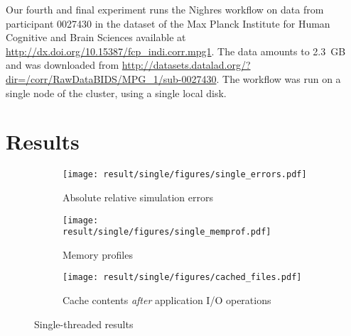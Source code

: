 \documentclass[conference]{IEEEtran}
\begin{document}
            Our fourth and final experiment runs the Nighres workflow on
            data from participant 0027430 in the dataset of the Max Planck Institute for
            Human Cognitive and Brain Sciences
            available at
            \url{http://dx.doi.org/10.15387/fcp_indi.corr.mpg1}. The data
            amounts to 2.3~GB and was downloaded from
            \url{http://datasets.datalad.org/?dir=/corr/RawDataBIDS/MPG_1/sub-0027430}.
            The workflow was run on a single node of the cluster, using a
            single local disk.

    \section{Results}
    \label{results}

    \begin{figure*}
        \centering
        \begin{subfigure}{\linewidth}
            \centering
               \texttt{[image: result/single/figures/single\_errors.pdf]}
               \vspace*{-0.7cm}
               \caption{Absolute relative simulation errors}
               \vspace*{0.5cm}
               \label{fig:single_error}
            \end{subfigure}
        \begin{subfigure}{\linewidth}
            \centering
               \texttt{[image: result/single/figures/single\_memprof.pdf]}
               \vspace*{-0.7cm}
               \caption{Memory profiles}
               \vspace*{0.5cm}
               \label{fig:single_memprof}
        \end{subfigure}
        \begin{subfigure}{\linewidth}
            \centering
               \texttt{[image: result/single/figures/cached\_files.pdf]}
               \caption{Cache contents \emph{after} application I/O operations}
               \label{fig:single_cache}
        \end{subfigure}
        \caption{Single-threaded results}
        \end{figure*}
\end{document}
